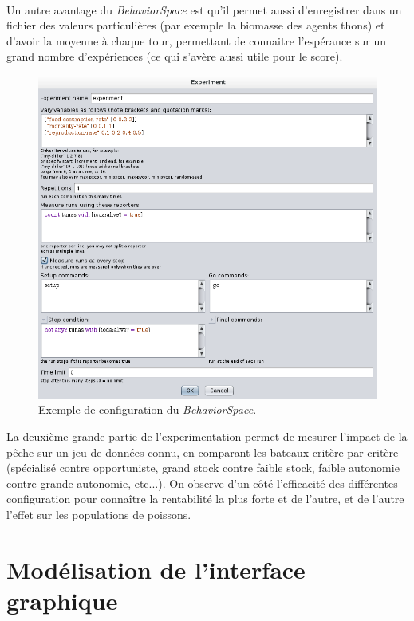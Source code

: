 \\
Un autre avantage du \textit{BehaviorSpace} est qu'il permet aussi d'enregistrer dans un fichier des valeurs particulières (par exemple la biomasse des agents thons) et d'avoir la moyenne à chaque tour, permettant de connaitre l'espérance sur un grand nombre d'expériences (ce qui s'avère aussi utile pour le score).
\begin{figure}[h]
  \begin{center}
    \includegraphics[scale=0.50]{img/behaviorspace.png}
  \end{center}
  \caption{Exemple de configuration du \textit{BehaviorSpace}.}
  \label{fig:behaviorspace}
\end{figure}

La deuxième grande partie de l'experimentation permet de mesurer l'impact de la pêche sur un jeu de données connu, en comparant les bateaux critère par critère (spécialisé contre opportuniste, grand stock contre faible stock, faible autonomie contre grande autonomie, etc...). On observe d'un côté l'efficacité des différentes configuration pour connaître la rentabilité la plus forte et de l'autre, et de l'autre l'effet sur les populations de poissons.

\section{Modélisation de l'interface graphique}

